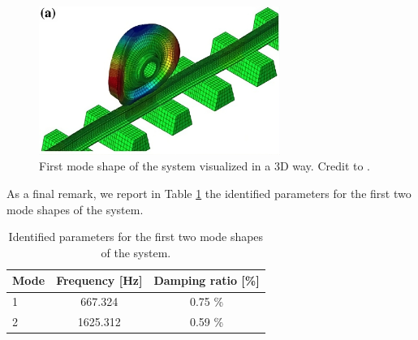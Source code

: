 \begin{figure}[H]
    \centering
    \includegraphics[width=0.7\textwidth]{img/wheel-FEM-first-mode-shape.png}
    \caption{First mode shape of the system visualized in a 3D way. Credit to \cite{FEM_rail_wheel}.}
    \label{fig:mode_shape_3D}
\end{figure}

As a final remark, we report in Table \ref{tab:mode_shapes_parameters} the identified parameters for the first two mode shapes of the system.

\begin{table}[H]
    \centering
    \begin{tabular}{lcc}
        \hline
        Mode & Frequency [Hz] & Damping ratio [\%] \\
        \hline
        1    & 667.324        & 0.75 \%            \\
        2    & 1625.312       & 0.59 \%            \\
        \hline
    \end{tabular}
    \caption{Identified parameters for the first two mode shapes of the system.}
    \label{tab:mode_shapes_parameters}
\end{table}

